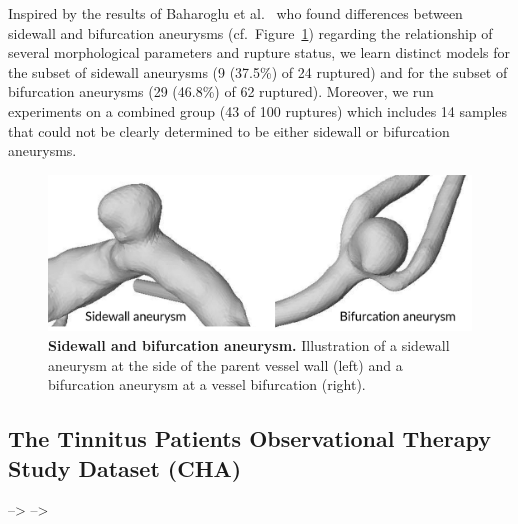 \documentclass[
  oneside]{book}
\begin{document}
Inspired by the results of Baharoglu et al.~\autocite{BaharogluEtAl:Neurosurgery2012} who found differences between sidewall and bifurcation aneurysms (cf.~Figure~\ref{fig:02-aneurd-sw-bf}) regarding the relationship of several morphological parameters and rupture status, we learn distinct models for the subset of sidewall aneurysms (9 (37.5\%) of 24 ruptured) and for the subset of bifurcation aneurysms (29 (46.8\%) of 62 ruptured).
Moreover, we run experiments on a combined group (43 of 100 ruptures) which includes 14 samples that could not be clearly determined to be either sidewall or bifurcation aneurysms.



\begin{figure}

{\centering \includegraphics[width=0.67\linewidth]{figures/02-aneurd-sw-bf} 

}

\caption{\textbf{Sidewall and bifurcation aneurysm.} Illustration of a sidewall aneurysm at the side of the parent vessel wall (left) and a bifurcation aneurysm at a vessel bifurcation (right).}\label{fig:02-aneurd-sw-bf}
\end{figure}

\hypertarget{cha}{%
\subsection{The Tinnitus Patients Observational Therapy Study Dataset (CHA)}\label{cha}}

--\textgreater{}
--\textgreater{}
\end{document}
